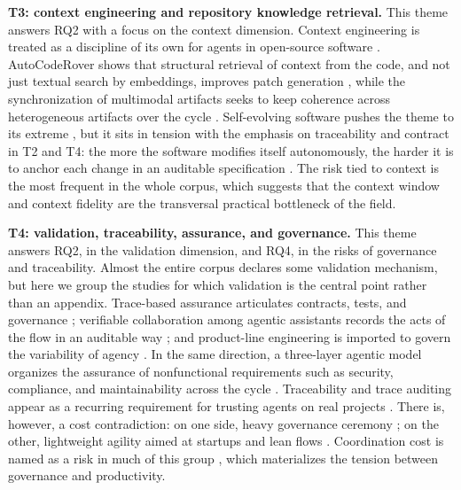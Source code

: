 \noindent\textbf{T3: context engineering and repository knowledge retrieval.} This theme answers RQ2 with a focus on the context dimension. Context engineering is treated as a discipline of its own for agents in open-source software \cite{SeyedmoeinMohsenimofidi2025}. AutoCodeRover shows that structural retrieval of context from the code, and not just textual search by embeddings, improves patch generation \cite{YuntongZhang2024}, while the synchronization of multimodal artifacts seeks to keep coherence across heterogeneous artifacts over the cycle \cite{Paiva2026}. Self-evolving software pushes the theme to its extreme \cite{LiyiCai2025}, but it sits in tension with the emphasis on traceability and contract in T2 and T4: the more the software modifies itself autonomously, the harder it is to anchor each change in an auditable specification \cite{Macedo2026,AhmedEHassan2024,Chechik2026}. The risk tied to context is the most frequent in the whole corpus, which suggests that the context window and context fidelity are the transversal practical bottleneck of the field.

\noindent\textbf{T4: validation, traceability, assurance, and governance.} This theme answers RQ2, in the validation dimension, and RQ4, in the risks of governance and traceability. Almost the entire corpus declares some validation mechanism, but here we group the studies for which validation is the central point rather than an appendix. Trace-based assurance articulates contracts, tests, and governance \cite{Paduraru2026}; verifiable collaboration among agentic assistants records the acts of the flow in an auditable way \cite{Merchant2025}; and product-line engineering is imported to govern the variability of agency \cite{Alsegier2026}. In the same direction, a three-layer agentic model organizes the assurance of nonfunctional requirements such as security, compliance, and maintainability across the cycle \cite{Zabardast2025}. Traceability and trace auditing appear as a recurring requirement for trusting agents on real projects \cite{Paduraru2026,Merchant2025,Macedo2026,SKaruppuchamy2026,Watfa2026,Chechik2026,Anon2026}. There is, however, a cost contradiction: on one side, heavy governance ceremony \cite{Merchant2025,Paduraru2026}; on the other, lightweight agility aimed at startups and lean flows \cite{Khan2026,RanjanSapkota2025,JulesWhite2023}. Coordination cost is named as a risk in much of this group \cite{MitulModi2024,Ulfsnes2024,Akbar2025,Baron2025,KRRaghi2024,Gupta2022,KumarAle2024}, which materializes the tension between governance and productivity.

